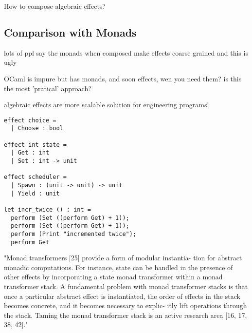 How to compose algebraic effects?
\begin{example}
\end{example}

\subsection{Comparison with Monads}
lots of ppl say the monads when composed make effects coarse grained
and this is ugly

OCaml is impure but has monads, and soon effects, wen you need them?
is this the most 'pratical' approach?

algebraic effects are more scalable solution for engineering programs!
\begin{verbatim}
effect choice =
  | Choose : bool

effect int_state =
  | Get : int
  | Set : int -> unit

effect scheduler =
  | Spawn : (unit -> unit) -> unit
  | Yield : unit

let incr_twice () : int =
  perform (Set ((perform Get) + 1));
  perform (Set ((perform Get) + 1));
  perform (Print "incremented twice");
  perform Get
\end{verbatim}

"Monad transformers [25] provide a form of modular instantia- tion for abstract monadic computations. For instance, state can be handled in the presence of other effects by incorporating a state monad transformer within a monad transformer stack.
A fundamental problem with monad transformer stacks is that once a particular abstract effect is instantiated, the order of effects in the stack becomes concrete, and it becomes necessary to explic- itly lift operations through the stack. Taming the monad transformer stack is an active research area [16, 17, 38, 42]."
\cite{kammar2013handlers}
